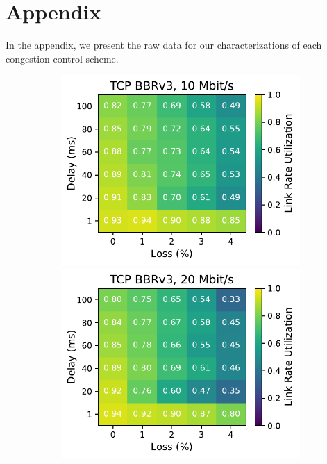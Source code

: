 \section{Appendix}
\label{sec:appendix}

In the appendix, we present the raw data for our characterizations of each
congestion control scheme.

\begin{figure}[ht]
    \centering
    \begin{subfigure}[b]{0.22\linewidth}
        \includegraphics[width=\linewidth,trim={0 0 2cm 0},clip]{figures/heatmaps/heatmap_tcp_bbr3_10mbps.pdf}
        \includegraphics[width=\linewidth,trim={0 0 2cm 0},clip]{figures/heatmaps/heatmap_tcp_bbr3_20mbps.pdf}

\end{subfigure}
\end{figure}
